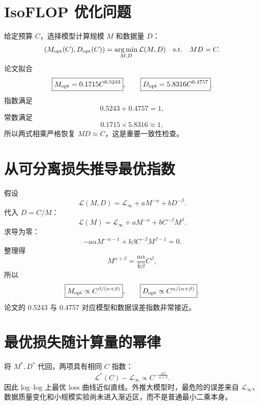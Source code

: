 \documentclass[UTF8,12pt,a4paper,fontset=none]{ctexart}
\numberwithin{equation}{section}
\newcommand{\Loss}{\mathcal{L}}
\newcommand{\argmin}{\operatorname*{arg\,min}}
\begin{document}
\section{IsoFLOP 优化问题}
给定预算 $C$，选择模型计算规模 $M$ 和数据量 $D$：
\begin{equation}
 (M_{\rm opt}(C),D_{\rm opt}(C))
 =\argmin_{M,D}\Loss(M,D)
 \quad\text{s.t.}\quad MD=C.
\end{equation}
论文拟合
\begin{equation}
 \boxed{M_{\rm opt}=0.1715C^{0.5243}},
 \qquad
 \boxed{D_{\rm opt}=5.8316C^{0.4757}}.
\end{equation}
指数满足
\begin{equation}
 0.5243+0.4757=1,
\end{equation}
常数满足
\begin{equation}
 0.1715\times5.8316\approx1,
\end{equation}
所以两式相乘严格恢复 $MD\approx C$，这是重要一致性检查。

\section{从可分离损失推导最优指数}
假设
\begin{equation}
 \Loss(M,D)=\Loss_\infty+aM^{-\alpha}+bD^{-\beta}.
\end{equation}
代入 $D=C/M$：
\begin{equation}
 \Loss(M)=\Loss_\infty+aM^{-\alpha}+bC^{-\beta}M^\beta.
\end{equation}
求导为零：
\begin{equation}
 -a\alpha M^{-\alpha-1}+b\beta C^{-\beta}M^{\beta-1}=0.
\end{equation}
整理得
\begin{equation}
 M^{\alpha+\beta}=\frac{a\alpha}{b\beta}C^\beta,
\end{equation}
所以
\begin{equation}
 \boxed{M_{\rm opt}\propto C^{\beta/(\alpha+\beta)}},
 \qquad
 \boxed{D_{\rm opt}\propto C^{\alpha/(\alpha+\beta)}}.
\end{equation}
论文的 0.5243 与 0.4757 对应模型和数据误差指数非常接近。

\section{最优损失随计算量的幂律}
将 $M^*,D^*$ 代回，两项具有相同 $C$ 指数：
\begin{equation}
 \Loss^*(C)-\Loss_\infty\propto
 C^{-\frac{\alpha\beta}{\alpha+\beta}}.
\end{equation}
因此 log--log 上最优 loss 曲线近似直线。外推大模型时，最危险的误差来自 $\Loss_\infty$、数据质量变化和小规模实验尚未进入渐近区，而不是普通最小二乘本身。
\end{document}
